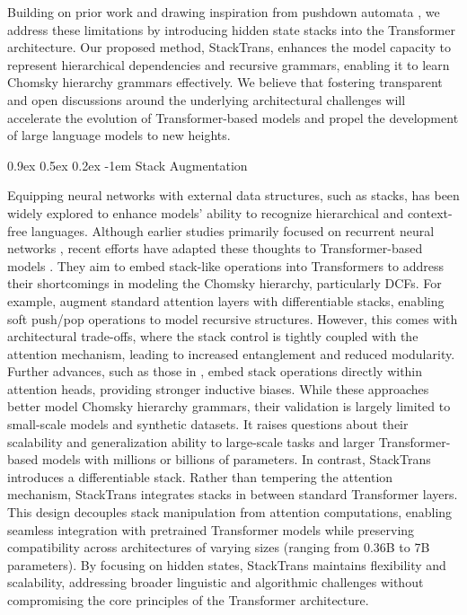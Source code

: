 \documentclass{article}
\makeatletter
\providecommand{\paragraph}{}
\renewcommand{\paragraph}[1]{%
  \@startsection{paragraph}{4}{\z@}%
                {0.9ex \@plus 0.5ex \@minus 0.2ex}%
                {-1em}%
                {\normalsize\bfseries}%
  {#1}
}
\DeclareRobustCommand{\method}{{\sc StackTrans}\xspace}
\makeatother
\begin{document}
Building on prior work and drawing inspiration from pushdown automata \citep{dusell2024stack, li2024Transformer, sartran2022Transformer}, we address these limitations by introducing hidden state stacks into the Transformer architecture.
Our proposed method, \method, enhances the model capacity to represent hierarchical dependencies and recursive grammars, enabling it to learn Chomsky hierarchy grammars effectively.
We believe that fostering transparent and open discussions around the underlying architectural challenges will accelerate the evolution of Transformer-based models and propel the development of large language models to new heights.


\paragraph{Stack Augmentation}
Equipping neural networks with external data structures, such as stacks, has been widely explored to enhance models' ability to recognize hierarchical and context-free languages.
Although earlier studies primarily focused on recurrent neural networks \citep{joulin2015inferring, grefenstette2015learning}, recent efforts have adapted these thoughts to Transformer-based models \citep{dusell2024stack, li2024Transformer, sartran2022Transformer}.
They aim to embed stack-like operations into Transformers to address their shortcomings in modeling the Chomsky hierarchy, particularly DCFs.
For example, \cite{li2024Transformer} augment standard attention layers with differentiable stacks, enabling soft push/pop operations to model recursive structures. However, this comes with architectural trade-offs, where the stack control is tightly coupled with the attention mechanism, leading to increased entanglement and reduced modularity.
Further advances, such as those in \cite{dusell2024stack}, embed stack operations directly within attention heads, providing stronger inductive biases.
While these approaches better model Chomsky hierarchy grammars, their validation is largely limited to small-scale models and synthetic datasets.
It raises questions about their scalability and generalization ability to large-scale tasks and larger Transformer-based models with millions or billions of parameters.
In contrast, \method introduces a differentiable stack.
Rather than tempering the attention mechanism, \method integrates stacks in between standard Transformer layers.
This design decouples stack manipulation from attention computations, enabling seamless integration with pretrained Transformer models while preserving compatibility across architectures of varying sizes (ranging from 0.36B to 7B parameters).
By focusing on hidden states, \method maintains flexibility and scalability, addressing broader linguistic and algorithmic challenges without compromising the core principles of the Transformer architecture.
\end{document}
